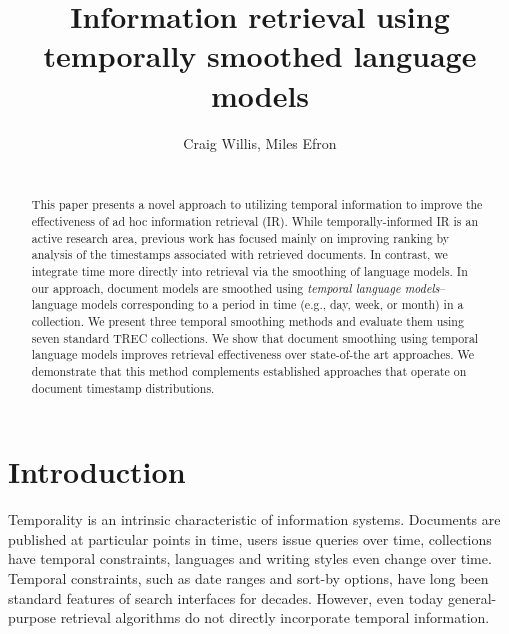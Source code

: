\documentclass{sig-alternate}
\newcommand{\ignore}[1]{}
\begin{document}
\title{Information retrieval using temporally smoothed language models}

\author{
Craig Willis, Miles Efron\\[1ex]
\\
}

\maketitle
\begin{abstract}

This paper presents a novel approach to utilizing temporal information to improve the effectiveness of ad hoc information retrieval (IR).  While temporally-informed IR is an active research area, previous work has focused mainly on improving ranking by analysis of the timestamps associated with retrieved documents.  In contrast, we integrate time more directly into retrieval via the smoothing of language models.  In our approach, document models are smoothed using  \emph{temporal language models}--language models corresponding to a period in time (e.g., day, week, or month) in a collection. We present three temporal smoothing methods and evaluate them using seven standard TREC collections. We show that document smoothing using temporal language models improves retrieval effectiveness over state-of-the art approaches. We demonstrate that this method complements established approaches that operate on document timestamp distributions.

\end{abstract}


\section{Introduction}\label{section.intro}

Temporality is an intrinsic characteristic of information systems. Documents are published at particular
points in time, users issue queries over time, collections have temporal constraints, languages and 
writing styles even change over time. Temporal constraints, such as date ranges and sort-by options, 
have long been standard features of search interfaces for decades.  However, even today general-purpose
retrieval algorithms do not directly incorporate temporal information. 
\end{document}
